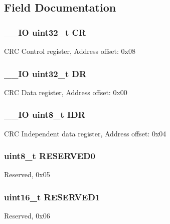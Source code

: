 \subsection{Field Documentation}
\hypertarget{struct_c_r_c___type_def_ab40c89c59391aaa9d9a8ec011dd0907a}{
\subsubsection[{C\-R}]{\setlength{\rightskip}{0pt plus 5cm}\-\_\-\-\_\-\-I\-O uint32\-\_\-t C\-R}}\label{struct_c_r_c___type_def_ab40c89c59391aaa9d9a8ec011dd0907a}
C\-R\-C Control register, Address offset\-: 0x08 \hypertarget{struct_c_r_c___type_def_a3df0d8dfcd1ec958659ffe21eb64fa94}{
\subsubsection[{D\-R}]{\setlength{\rightskip}{0pt plus 5cm}\-\_\-\-\_\-\-I\-O uint32\-\_\-t D\-R}}\label{struct_c_r_c___type_def_a3df0d8dfcd1ec958659ffe21eb64fa94}
C\-R\-C Data register, Address offset\-: 0x00 \hypertarget{struct_c_r_c___type_def_a601d7b0ba761c987db359b2d7173b7e0}{
\subsubsection[{I\-D\-R}]{\setlength{\rightskip}{0pt plus 5cm}\-\_\-\-\_\-\-I\-O uint8\-\_\-t I\-D\-R}}\label{struct_c_r_c___type_def_a601d7b0ba761c987db359b2d7173b7e0}
C\-R\-C Independent data register, Address offset\-: 0x04 \hypertarget{struct_c_r_c___type_def_aa7d2bd5481ee985778c410a7e5826b71}{
\subsubsection[{R\-E\-S\-E\-R\-V\-E\-D0}]{\setlength{\rightskip}{0pt plus 5cm}uint8\-\_\-t R\-E\-S\-E\-R\-V\-E\-D0}}\label{struct_c_r_c___type_def_aa7d2bd5481ee985778c410a7e5826b71}
Reserved, 0x05 \hypertarget{struct_c_r_c___type_def_a8249a3955aace28d92109b391311eb30}{
\subsubsection[{R\-E\-S\-E\-R\-V\-E\-D1}]{\setlength{\rightskip}{0pt plus 5cm}uint16\-\_\-t R\-E\-S\-E\-R\-V\-E\-D1}}\label{struct_c_r_c___type_def_a8249a3955aace28d92109b391311eb30}
Reserved, 0x06 

